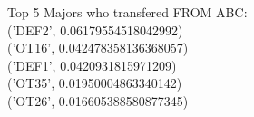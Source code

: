 Top 5 Majors who transfered FROM ABC: \\
('DEF2', 0.06179554518042992) \\
('OT16', 0.042478358136368057) \\
('DEF1', 0.0420931815971209) \\
('OT35', 0.01950004863340142) \\
('OT26', 0.016605388580877345) \\
